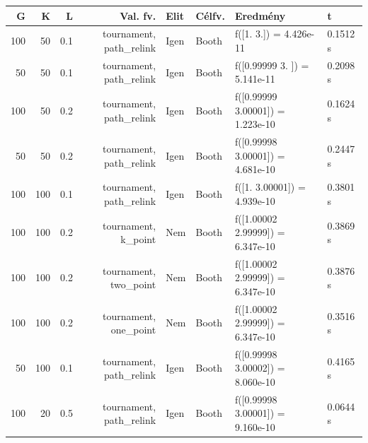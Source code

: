 \begin{tabular}{rrrrllll}
G & K & L & Val. fv. & Elit & Célfv. & Eredmény & t \\
\hline
100 & 50 & 0.1 & tournament, path\_relink & Igen & Booth & f([1. 3.]) = 4.426e-11 & 0.1512 s \\
50 & 50 & 0.1 & tournament, path\_relink & Igen & Booth & f([0.99999 3.     ]) = 5.141e-11 & 0.2098 s \\
100 & 50 & 0.2 & tournament, path\_relink & Igen & Booth & f([0.99999 3.00001]) = 1.223e-10 & 0.1624 s \\
50 & 50 & 0.2 & tournament, path\_relink & Igen & Booth & f([0.99998 3.00001]) = 4.681e-10 & 0.2447 s \\
100 & 100 & 0.1 & tournament, path\_relink & Igen & Booth & f([1.      3.00001]) = 4.939e-10 & 0.3801 s \\
100 & 100 & 0.2 & tournament, k\_point & Nem & Booth & f([1.00002 2.99999]) = 6.347e-10 & 0.3869 s \\
100 & 100 & 0.2 & tournament, two\_point & Nem & Booth & f([1.00002 2.99999]) = 6.347e-10 & 0.3876 s \\
100 & 100 & 0.2 & tournament, one\_point & Nem & Booth & f([1.00002 2.99999]) = 6.347e-10 & 0.3516 s \\
50 & 100 & 0.1 & tournament, path\_relink & Igen & Booth & f([0.99998 3.00002]) = 8.060e-10 & 0.4165 s \\
100 & 20 & 0.5 & tournament, path\_relink & Igen & Booth & f([0.99998 3.00001]) = 9.160e-10 & 0.0644 s \\
\end{tabular}
